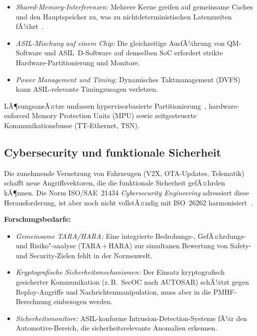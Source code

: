 ﻿\documentclass[a4paper,12pt]{article}
\theoremstyle{definition}
\begin{document}
\begin{itemize}
  \item \emph{Shared-Memory-Interferenzen:} Mehrere Kerne greifen
        auf gemeinsame Caches und den Hauptspeicher zu, was zu
        nichtdeterministischen Latenzzeiten fÃ¼hrt~\cite{jmc_2018}.
  \item \emph{ASIL-Mischung auf einem Chip:} Die gleichzeitige
        AusfÃ¼hrung von QM-Software und ASIL~D-Software auf demselben
        SoC erfordert strikte Hardware-Partitionierung und Monitore.
  \item \emph{Power Management und Timing:}
        Dynamisches Taktmanagement (DVFS) kann ASIL-relevante
        Timingzusagen verletzen.
\end{itemize}

LÃ¶sungsansÃ¤tze umfassen hypervisorbasierte Partitionierung~\cite{heiser_2020},
hardware-enforced Memory Protection Units (MPU) sowie
zeitgesteuerte Kommunikationsbusse (TT-Ethernet, TSN).

\subsection{Cybersecurity und funktionale Sicherheit}

Die zunehmende Vernetzung von Fahrzeugen (V2X, OTA-Updates,
Telematik) schafft neue Angriffsvektoren, die die funktionale
Sicherheit gefÃ¤hrden kÃ¶nnen. Die Norm ISO/SAE~21434
\emph{Cybersecurity Engineering} adressiert diese Herausforderung,
ist aber noch nicht vollstÃ¤ndig mit ISO~26262 harmonisiert~\cite{iso21434_2021}.

\textbf{Forschungsbedarfe:}
\begin{itemize}
  \item \emph{Gemeinsame TARA/HARA:}
        Eine integrierte Bedrohungs-, GefÃ¤hrdungs- und Risiko"-analyse
        (TARA\,+\,HARA) zur simultanen Bewertung von Safety- und
        Security-Zielen fehlt in der Normenwelt.
  \item \emph{Kryptografische Sicherheitsmechanismen:}
        Der Einsatz kryptografisch gesicherter Kommunikation
        (z.\,B.\ SecOC nach AUTOSAR) schÃ¼tzt gegen Replay-Angriffe
        und Nachrichtenmanipulation, muss aber in die
        PMHF-Berechnung einbezogen werden.
  \item \emph{Sicherheitsmonitore:}
        ASIL-konforme Intrusion-Detection-Systeme fÃ¼r den
        Automotive-Bereich, die sicherheitsrelevante Anomalien
        erkennen.
\end{itemize}
\end{document}
